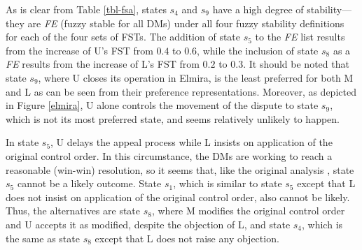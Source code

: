As is clear from Table \ref{tbl-fsa}, states $s_4$ and $s_9$ have a high degree of stability---they are \emph{FE} (fuzzy stable for all DMs) under all four fuzzy stability definitions for each of the four sets of FSTs. The addition of state $s_5$ to the \emph{FE} list results from the increase of U's FST from $0.4$ to $0.6$, while the inclusion of state $s_8$ as a \emph{FE} results from the increase of L's FST from $0.2$ to $0.3$. It should be noted that state $s_9$, where U closes its operation in Elmira, is the least preferred for both M and L as can be seen from their preference representations. Moreover, as depicted in Figure \ref{elmira}, U alone controls the movement of the dispute to state $s_9$, which is not its most preferred state, and seems relatively unlikely to happen.

In state $s_5$, U delays the appeal process while L insists on application of the original control order. In this circumstance, the DMs are working to reach a reasonable (win-win) resolution, so it seems that, like the original analysis \citep{Hipel-et-al1993a}, state $s_5$ cannot be a likely outcome. State $s_1$, which is similar to state $s_5$ except that L does not insist on application of the original control order, also cannot be likely. Thus, the alternatives are state $s_8$, where M modifies the original control order and U accepts it as modified, despite the objection of L, and state $s_4$, which is the same as state $s_8$ except that L does not raise any objection.

